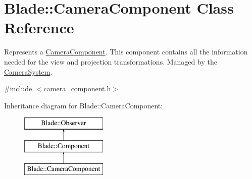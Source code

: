 \hypertarget{class_blade_1_1_camera_component}{}\section{Blade\+:\+:Camera\+Component Class Reference}
\label{class_blade_1_1_camera_component}


Represents a \hyperlink{class_blade_1_1_camera_component}{Camera\+Component}. This component contains all the information needed for the view and projection transformations. Managed by the \hyperlink{class_blade_1_1_camera_system}{Camera\+System}.  




{\ttfamily \#include $<$camera\+\_\+component.\+h$>$}

Inheritance diagram for Blade\+:\+:Camera\+Component\+:\begin{figure}[H]
\begin{center}
\leavevmode
\includegraphics[height=3.000000cm]{class_blade_1_1_camera_component}
\end{center}
\end{figure}
